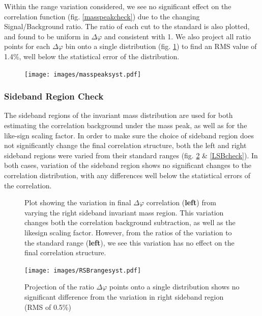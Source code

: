 \documentclass[ALICE,manyauthors]{ALICE_analysis_notes}
\begin{document}
Within the range variation considered, we see no significant effect on the correlation function (fig. \ref{masspeakcheck}) due to the changing Signal/Background ratio. The ratio of each cut to the standard is also plotted, and found to be uniform in $\Delta\varphi$ and consistent with 1.  We also project all ratio points for each $\Delta\varphi$ bin onto a single distribution (fig. \ref{masspeakRMS}) to find an RMS value of 1.4\%, well below the statistical error of the distribution.

\begin{figure}[ht]
\centering
\texttt{[image: images/masspeaksyst.pdf]}
\caption{ }
\label{masspeakRMS}
\end{figure}


\subsubsection{Sideband Region Check}

The sideband regions of the invariant mass distribution are used for both estimating the correlation background under the mass peak, as well as for the like-sign scaling factor.  In order to make sure the choice of sideband region does not significantly change the final correlation structure, both the left and right sideband regions were varied from their standard ranges (fig. \ref{RSBcheck} \& \ref{LSBcheck}).  In both cases, variation of the sideband region shows no significant changes to the correlation distribution, with any differences well below the statistical errors of the correlation.

\begin{figure}[ht]
\centering
\begin{subfigure}{
\texttt{[image: images/RSBrangedphi.pdf]}}
\end{subfigure}
\begin{subfigure}{
\texttt{[image: images/RSBrangeratios.pdf]}}
\end{subfigure}
\caption{Plot showing the variation in final $\Delta\varphi$ correlation (\textbf{left}) from varying the right sideband invariant mass region.  This variation changes both the correlation background subtraction, as well as the likesign scaling factor. However, from the ratios of the variation to the standard range (\textbf{left}), we see this variation has no effect on the final correlation structure.}
\label{RSBcheck}
\end{figure}

\begin{figure}[ht]
\centering
\texttt{[image: images/RSBrangesyst.pdf]}
\caption{Projection of the ratio $\Delta\varphi$ points onto a single distribution shows no significant difference from the variation in right sideband region (RMS of 0.5\%)}
\label{RSBRMS}
\end{figure}
\end{document}
